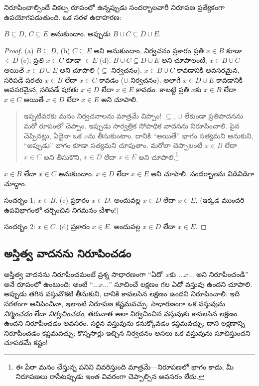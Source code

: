 \documentclass[../../../include/open-logic-section]{subfiles}
\begin{document}
నిరూపించాల్సిందే వికల్ప రూపంలో ఉన్నప్పుడు సందర్భాలవారీ నిరూపణ ప్రత్యేకంగా ఉపయోగపడుతుంది. ఒక సరళ ఉదాహరణ:

\begin{prop}
$B \subseteq D$, $C \subseteq E$ అనుకుందాం. అప్పుడు $B \cup C \subseteq
D \cup E$.
\end{prop}

\begin{proof}
  (a) $B \subseteq D$, (b) $C \subseteq E$ అని అనుకుందాం. నిర్వచనం ప్రకారం ప్రతి $x \in B$ కూడా $\in D$ (c); ప్రతి $x \in C$ కూడా $\in E$ (d). $B \cup C \subseteq D \cup E$ అని చూపాలంటే, $x \in B \cup C$ అయితే $x \in D \cup E$ అని చూపాలి ($\subseteq$ నిర్వచనం). $x \in B \cup C$ కావడానికి అవసరమైన, సరిపడే షరతు $x \in B$ లేదా $x \in
  C$ కావడం ($\cup$ నిర్వచనం). అలాగే $x \in D \cup E$ కావడానికి అవసరమైన, సరిపడే షరతు $x \in
  D$ లేదా $x \in E$ కావడం. కాబట్టి ప్రతి $x$కు $x \in B$ లేదా $x \in C$ అయితే $x \in D$ లేదా $x \in E$ అని చూపాలి.

  \begin{quote}
  ఇప్పటివరకు మనం నిర్వచనాలను మాత్రమే విప్పాం!{} $\subseteq$, $\cup$ లేకుండా ప్రతిపాదనను మరో రూపంలో చెప్పాం. ఇప్పుడు సార్వత్రిక సోపాధిక వాదనను నిరూపించాలి. పైన చెప్పినట్లు, ఏదైనా ఒక $x$ను తీసుకుంటాం. దానికి ``అయితే''
భాగం సత్యమని అనుకుని, ``అప్పుడు'' భాగం కూడా సత్యమని చూపుతాం. మరోలా చెప్పాలంటే $x
  \in B$ లేదా $x \in C$ అని తీసుకొని, $x \in D$ లేదా $x \in
  E$ అని చూపాలి.\footnote{ఈ పేరా మనం చేస్తున్న పనిని వివరిస్తుంది మాత్రమే---నిరూపణలో భాగం కాదు; మీ నిరూపణలు రాసేటప్పుడు ఇంత వివరంగా చెప్పాల్సిన అవసరం లేదు.}
  \end{quote}

  $x \in B$ లేదా $x \in C$ అనుకుందాం. $x \in D$ లేదా $x \in E$ అని చూపాలి. సందర్భాలను విడివిడిగా చూద్దాం.

  సందర్భం 1: $x \in B$. (c) ప్రకారం $x \in D$. అందువల్ల $x \in D$ లేదా $x \in
  E$. (ఇక్కడ ముందరి ఉపవిభాగంలో చర్చించిన నిగమనం చేశాం!)

  సందర్భం 2: $x \in C$. (d) ప్రకారం $x \in E$. అందువల్ల $x \in D$ లేదా $x \in E$.
\end{proof}

\subsection{అస్తిత్వ వాదనను నిరూపించడం}

అస్తిత్వ వాదనను నిరూపించమంటే ప్రశ్న సాధారణంగా ``ఏదో~$x$కు $\dots x \dots$ అని నిరూపించండి'' అనే రూపంలో ఉంటుంది; అంటే ``$\dots x \dots$'' సూచించే లక్షణం గల ఏదో వస్తువు ఉందని చూపాలి. అప్పుడు తగిన వస్తువొకటి తీసుకుని, దానికి కావలసిన లక్షణం ఉందని నిరూపించాలి. ఇది సరళంగా అనిపించినా, ఇలాంటి నిరూపణ కష్టమవచ్చు. సాధారణంగా ఒక వస్తువును \emph{నిర్మించడం} లేదా \emph{నిర్వచించడం}, తరువాత అలా నిర్వచించిన వస్తువుకు కావలసిన లక్షణం ఉందని నిరూపించడం అవసరం. సరైన వస్తువును కనుక్కోవడం కష్టమవచ్చు; దాని లక్షణాన్ని నిరూపించడం కష్టమవచ్చు; కొన్నిసార్లు ఇచ్చిన నిర్వచనం అసలు ఒక వస్తువును సూచిస్తుందని చూపడమే కష్టం!{}
\end{document}
